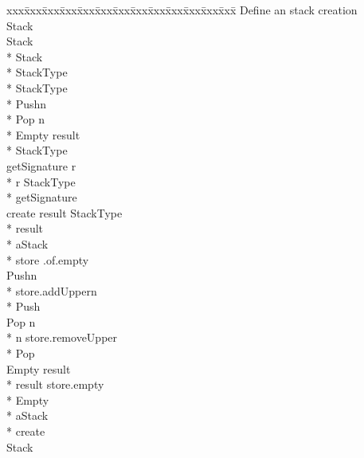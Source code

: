 {\small\it\begin{minipage}{\textwidth}\begin{tabbing}
xxx\=xxx\=xxx\=xxx\=xxx\=xxx\=xxx\=xxx\=xxx\=xxx\=xxx\=xxx\=xxx\=\+\kill%
\cd{} Define an  stack creation \\[1.0ex]{}%
 Stack\\[1.0ex]{}%
 Stack \assign{}\+\\*{}%
    Stack\+\\*{}%
     StackType \assign{}\+\\*{}%
       StackType\+\\*{}%
         Push\/\LB{}n\CO{} \/\RB{}\\*{}%
         Pop \returns{} \/\LB{}n\CO{} \/\RB{}\\*{}%
         Empty \returns{} \/\LB{}result \CO{} \/\RB{}\-\\*{}%
       StackType\-\\[1.0ex]{}%
      getSignature \returns{} \/\LB{}r \CO{} \/\RB{}\+\\*{}%
      r \assign{} StackType\-\\*{}%
     getSignature\\[1.0ex]{}%
      create \returns{} \/\LB{}result \CO{} StackType\/\RB{}\+\\*{}%
      result \assign{} \+\\*{}%
         aStack\+\\*{}%
	   store \assign{} .of\/\LB{}\/\RB{}.empty\\[1.0ex]{}%
	    Push\/\LB{}n\CO{} \/\RB{}\+\\*{}%
	    store.addUpper\/\LB{}n\/\RB{}\-\\*{}%
	   Push\\[1.0ex]{}%
	    Pop \returns{} \/\LB{}n\CO{} \/\RB{}\+\\*{}%
	    n \assign{} store.removeUpper\-\\*{}%
	   Pop\\[1.0ex]{}%
	    Empty \returns{} \/\LB{}result \CO{} \/\RB{}\+\\*{}%
	    result \assign{} store.empty\-\\*{}%
	   Empty\-\\*{}%
         aStack\-\-\\*{}%
     create\-\-\\[1.0ex]{}%
 Stack
\end{tabbing}\end{minipage}}
